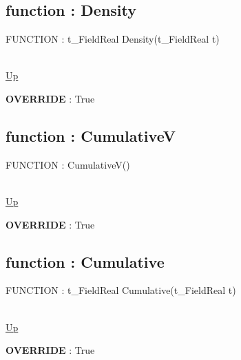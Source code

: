 \subsection*{function : Density}
\hypertarget{ecldoc:linearregression.ols.tdistribution.density}{FUNCTION : t\_FieldReal Density(t\_FieldReal t)} \\
\hyperlink{ecldoc:linearregression.ols.tdistribution}{Up} \\
\par
\textbf{OVERRIDE} : True \\
\subsection*{function : CumulativeV}
\hypertarget{ecldoc:linearregression.ols.tdistribution.cumulativev}{FUNCTION : CumulativeV()} \\
\hyperlink{ecldoc:linearregression.ols.tdistribution}{Up} \\
\par
\textbf{OVERRIDE} : True \\
\subsection*{function : Cumulative}
\hypertarget{ecldoc:linearregression.ols.tdistribution.cumulative}{FUNCTION : t\_FieldReal Cumulative(t\_FieldReal t)} \\
\hyperlink{ecldoc:linearregression.ols.tdistribution}{Up} \\
\par
\textbf{OVERRIDE} : True \\


